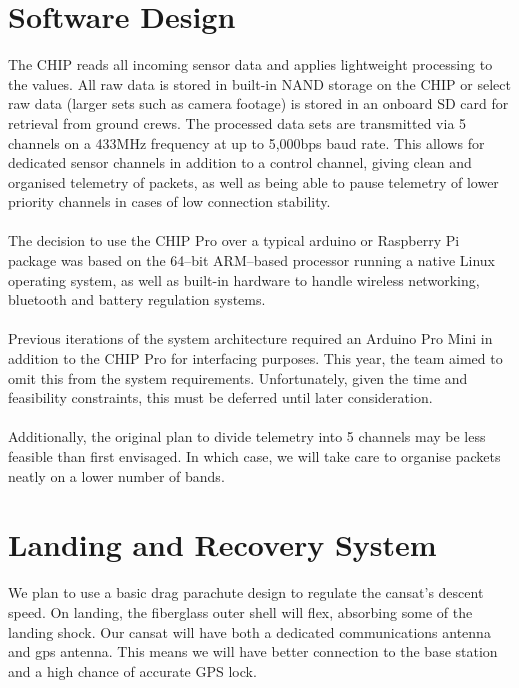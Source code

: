 \documentclass{report}
\begin{document}
	\section{Software Design}
		The CHIP reads all incoming sensor data and applies lightweight processing
		to the values. All raw data is stored in built-in NAND storage on the CHIP
		or select raw data (larger sets such as camera footage) is stored in an
		onboard SD card for retrieval from ground crews. The processed data sets 
		are transmitted via 5 channels on a 433MHz frequency at up to 5,000bps
		baud rate. This allows for dedicated sensor channels in addition to a control
		channel, giving clean and organised telemetry of packets, as well as being
		able to pause telemetry of lower priority channels in cases of low 
		connection stability.
		\\\\
		The decision to use the CHIP Pro over a typical arduino or Raspberry Pi
		package was based on the 64--bit ARM--based processor running a 
		native Linux operating system, as well as built-in hardware to handle 
		wireless networking, bluetooth and battery regulation systems.
		\\\\
		{\color{blue}Previous iterations of the system architecture required 
		an Arduino Pro Mini in addition to the CHIP Pro for interfacing purposes.
		This year, the team aimed to omit this from the system requirements.
		Unfortunately, given the time and feasibility constraints, this must be deferred
		until later consideration.
		\\\\
		Additionally, the original plan to divide telemetry into
		5 channels may be less feasible than first envisaged. In which case, we will 
		take care to organise packets neatly on a lower number of bands.
		}

	\section{Landing and Recovery System}
		We plan to use a basic drag parachute design to regulate the cansat’s 
		descent speed. On landing, the fiberglass outer shell will flex, absorbing 
		some of the landing shock. Our cansat will have both a dedicated
		communications antenna and gps antenna. This means we will have 
		better connection to the base station and a high chance of accurate GPS lock.
\end{document}
